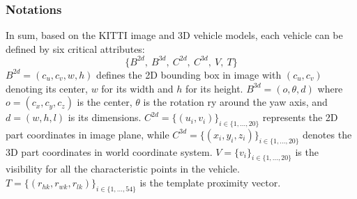 \subsubsection{Notations}
In sum, based on the KITTI image and 3D vehicle models, each vehicle can be defined by six critical attributes:
\[  \{B^{2d}, ~B^{3d}, ~C^{2d}, ~C^{3d}, ~V, ~T\}  \]
$B^{2d} = (c_u, c_v, w, h)$ defines the 2D bounding box in image with $(c_u, c_v)$ denoting its center,  $w$ for its width and $h$ for its height. $B^{3d} = (o, \theta, d)$ where $o = (c_x, c_y, c_z)$ is the center, $\theta$ is the rotation ry around the yaw axis, and $d = (w, h, l)$ is its dimensions. $C^{2d}  = \{(u_i, v_i)\}_{i \in \{1, ...,20\}}$ represents the 2D part coordinates in image plane, while $C^{3d}  = \{(x_i, y_i, z_i)\}_{i \in \{1, ...,20\}}$ denotes the 3D part coordinates in world coordinate system. $V = \{v_i\}_{i \in \{1, ...,20\}}$ is the visibility for all the characteristic points in the vehicle.  $T = \{(r_{hk},r_{wk},r_{lk})\}_{i \in \{1, ...,54\}}$ is the template proximity vector.
